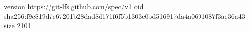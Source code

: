 version https://git-lfs.github.com/spec/v1
oid sha256:f9c819d7c67201b28dad8d171f6f5b1303e0bd516917da4a0691087f3ae36a43
size 2101
